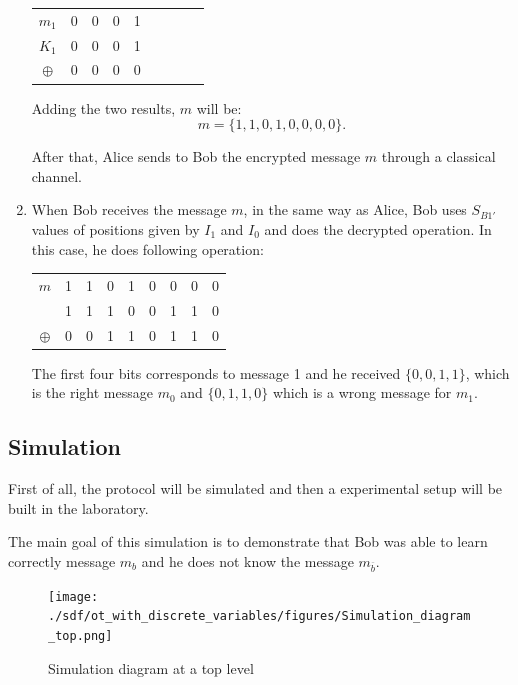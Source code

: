 \begin{enumerate}
   \begin{table}[H]
    \centering
    \begin{tabular}{c|c c c c c c c c}
     $m_{1}$ & 0 & 0 & 0 & 1 \\
     $K_{1}$ & 0 & 0 & 0 & 1 \\ \hline
     $\oplus$ & 0 & 0 & 0 & 0
    \end{tabular}
    \end{table}

    Adding the two results, $m$ will be: $$m=\{1,1,0,1,0,0,0,0\}.$$

   After that, Alice sends to Bob the encrypted message $m$ through a classical channel.

  \item When Bob receives the message $m$, in the same way as Alice, Bob uses $S_{B1\prime}$ values of positions given by $I_{1}$ and $I_{0}$ and does the decrypted operation. In this case, he does following operation:

      \begin{table}[H]
        \centering
        \begin{tabular}{c|c c c c c c c c}
         $m$ & 1 & 1 & 0 & 1 & 0 & 0 & 0 & 0 \\
             & 1 & 1 & 1 & 0 & 0 & 1 & 1 & 0 \\ \hline
         $\oplus$ & 0 & 0 & 1 & 1 & 0 & 1 & 1 & 0 \\
        \end{tabular}
        \end{table}

      The first four bits corresponds to message 1 and he received $\{0,0,1,1\}$, which is the right message $m_{0}$ and $\{0,1,1,0\}$ which is a wrong message for $m_{1}$.


\end{enumerate}

\subsection{Simulation}

First of all, the protocol will be simulated and then a experimental setup will be built in the laboratory.

The main goal of this simulation is to demonstrate that Bob was able to learn correctly message $m_{b}$ and he does not know the message $m_{\overline{b}}$.

\begin{figure}[H]
	\centering
	\texttt{[image: ./sdf/ot\_with\_discrete\_variables/figures/Simulation\_diagram\_top.png]}
	\caption{Simulation diagram at a top level}\label{toplevelsimulation}
\end{figure}

